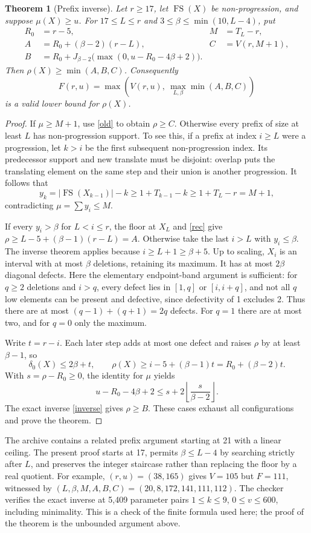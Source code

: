 \documentclass[11pt,a4paper]{article}
\newcommand{\FS}{\operatorname{FS}}
\newtheorem{theorem}{Theorem}[section]
\begin{document}
\begin{theorem}[Prefix inverse]\label{prefix}
Let $r\ge17$, let $\FS(X)$ be non-progression, and suppose $\mu(X)\ge u$.
For $17\le L\le r$ and $3\le\beta\le\min(10,L-4)$, put
\begin{align*}
 R_0&=r-5,&M&=T_L-r,\\
 A&=R_0+(\beta-2)(r-L),&C&=V(r,M+1),\\
 B&=R_0+J_{\beta-2}\bigl(\max(0,u-R_0-4\beta+2)\bigr).
\end{align*}
Then $\rho(X)\ge\min(A,B,C)$. Consequently
\begin{equation}\label{new}
 F(r,u)=\max\left(V(r,u),\ \max_{L,\beta}\min(A,B,C)\right)
\end{equation}
is a valid lower bound for $\rho(X)$.
\end{theorem}
\begin{proof}
If $\mu\ge M+1$, use \eqref{old} to obtain $\rho\ge C$.
Otherwise every prefix of size at least $L$ has non-progression support.
To see this, if a prefix at index $i\ge L$ were a progression, let
$k>i$ be the first subsequent non-progression index. Its predecessor
support and new translate must be disjoint: overlap puts the translating
element on the same step and their union is another progression.
It follows that
\[
 y_k=|\FS(X_{k-1})|-k\ge1+T_{k-1}-k\ge1+T_L-r=M+1,
\]
contradicting $\mu=\sum y_i\le M$.

If every $y_i>\beta$ for $L<i\le r$, the floor at $X_L$ and
\eqref{rec} give $\rho\ge L-5+(\beta-1)(r-L)=A$.
Otherwise take the last $i>L$ with $y_i\le\beta$. The inverse theorem
applies because $i\ge L+1\ge\beta+5$. Up to scaling, $X_i$ is an
interval with at most $\beta$ deletions, retaining its maximum.
It has at most $2\beta$ diagonal defects. Here the elementary
endpoint-band argument is sufficient: for $q\ge2$ deletions and $i>q$,
every defect lies in $[1,q]$ or $[i,i+q]$, and not all $q$ low elements
can be present and defective, since defectivity of 1 excludes 2.
Thus there are at most $(q-1)+(q+1)=2q$ defects. For $q=1$ there
are at most two, and for $q=0$ only the maximum.

Write $t=r-i$. Each later step adds at most one defect and raises
$\rho$ by at least $\beta-1$, so
\[
 \delta_0(X)\le2\beta+t,\qquad
 \rho(X)\ge i-5+(\beta-1)t=R_0+(\beta-2)t.
\]
With $s=\rho-R_0\ge0$, the identity for $\mu$ yields
\[
 u-R_0-4\beta+2\le s+2\left\lfloor\frac{s}{\beta-2}\right\rfloor.
\]
The exact inverse \eqref{inverse} gives $\rho\ge B$.
These cases exhaust all configurations and prove the theorem.
\end{proof}
The archive \cite{archive} contains a related prefix argument starting
at 21 with a linear ceiling. The present proof starts at 17, permits
$\beta\le L-4$ by searching strictly after $L$, and preserves the integer
staircase rather than replacing the floor by a real quotient.
For example, $(r,u)=(38,165)$ gives $V=105$ but $F=111$, witnessed by
$(L,\beta,M,A,B,C)=(20,8,172,141,111,112)$.
The checker verifies the exact inverse at 5,409 parameter pairs
$1\le k\le9$, $0\le v\le600$, including minimality. This is a check
of the finite formula used here; the proof of the theorem is the
unbounded argument above.
\end{document}
